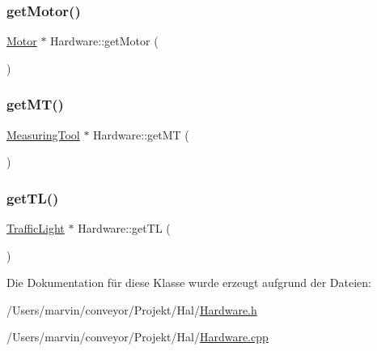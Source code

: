 \hypertarget{class_hardware_a0a896143b14292ea1805d43e384b4fa1}{}\label{class_hardware_a0a896143b14292ea1805d43e384b4fa1} 
\subsubsection{\texorpdfstring{get\+Motor()}{getMotor()}}
{\footnotesize\ttfamily \hyperlink{class_motor}{Motor} $\ast$ Hardware\+::get\+Motor (\begin{DoxyParamCaption}{ }\end{DoxyParamCaption})}

\hypertarget{class_hardware_a6acc1b03b3c39ddbd681058f49e9f1bd}{}\label{class_hardware_a6acc1b03b3c39ddbd681058f49e9f1bd} 
\subsubsection{\texorpdfstring{get\+M\+T()}{getMT()}}
{\footnotesize\ttfamily \hyperlink{class_measuring_tool}{Measuring\+Tool} $\ast$ Hardware\+::get\+MT (\begin{DoxyParamCaption}{ }\end{DoxyParamCaption})}

\hypertarget{class_hardware_a558325fc00a829ca20112234a961b153}{}\label{class_hardware_a558325fc00a829ca20112234a961b153} 
\subsubsection{\texorpdfstring{get\+T\+L()}{getTL()}}
{\footnotesize\ttfamily \hyperlink{class_traffic_light}{Traffic\+Light} $\ast$ Hardware\+::get\+TL (\begin{DoxyParamCaption}{ }\end{DoxyParamCaption})}



Die Dokumentation für diese Klasse wurde erzeugt aufgrund der Dateien\+:\begin{DoxyCompactItemize}
\item 
/\+Users/marvin/conveyor/\+Projekt/\+Hal/\hyperlink{_hardware_8h}{Hardware.\+h}\item 
/\+Users/marvin/conveyor/\+Projekt/\+Hal/\hyperlink{_hardware_8cpp}{Hardware.\+cpp}\end{DoxyCompactItemize}
